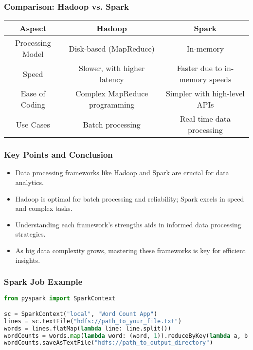 \documentclass[aspectratio=169]{beamer}
\begin{document}
\begin{frame}[fragile]
    \frametitle{Comparison: Hadoop vs. Spark}
    \begin{center}
    \begin{tabular}{|c|c|c|}
        \hline
        \textbf{Aspect} & \textbf{Hadoop} & \textbf{Spark} \\
        \hline
        Processing Model & Disk-based (MapReduce) & In-memory \\
        \hline
        Speed & Slower, with higher latency & Faster due to in-memory speeds \\
        \hline
        Ease of Coding & Complex MapReduce programming & Simpler with high-level APIs \\
        \hline
        Use Cases & Batch processing & Real-time data processing \\
        \hline
    \end{tabular}
    \end{center}
\end{frame}

\begin{frame}[fragile]
    \frametitle{Key Points and Conclusion}
    \begin{itemize}
        \item Data processing frameworks like Hadoop and Spark are crucial for data analytics.
        \item Hadoop is optimal for batch processing and reliability; Spark excels in speed and complex tasks.
        \item Understanding each framework's strengths aids in informed data processing strategies.
        \item As big data complexity grows, mastering these frameworks is key for efficient insights.
    \end{itemize}
\end{frame}

\begin{frame}[fragile]
    \frametitle{Spark Job Example}
    \begin{lstlisting}[language=Python]
from pyspark import SparkContext

sc = SparkContext("local", "Word Count App")
lines = sc.textFile("hdfs://path_to_your_file.txt")
words = lines.flatMap(lambda line: line.split())
wordCounts = words.map(lambda word: (word, 1)).reduceByKey(lambda a, b: a + b)
wordCounts.saveAsTextFile("hdfs://path_to_output_directory")
    \end{lstlisting}
\end{frame}
\end{document}
